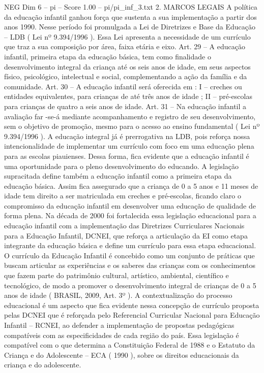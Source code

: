 \begin{textsample}{NEG Dim 6 – pi – Score 1.00 – pi/pi\_inf\_3.txt}  \label{ex:f6_neg_098}
2.
MARCOS LEGAIS A política da educação infantil ganhou força que sustenta a sua implementação a partir dos anos 1990.
Nesse período foi promulgada a Lei de Diretrizes e Base da Educação – LDB ( Lei nº 9.394/1996 ).
Essa Lei apresenta a necessidade de um currículo que traz a sua composição por área, faixa etária e eixo.
Art. 29 – A educação infantil, primeira etapa da educação básica, tem como finalidade o desenvolvimento integral da criança até os seis anos de idade, em seus aspectos físico, psicológico, intelectual e social, complementando a ação da família e da comunidade.
Art. 30 – A educação infantil será oferecida em : I – creches ou entidades equivalentes, para crianças de até três anos de idade ; II – pré-escolas para crianças de quatro a seis anos de idade.
Art. 31 – Na educação infantil a avaliação far -se-á mediante acompanhamento e registro de seu desenvolvimento, sem o objetivo de promoção, mesmo para o acesso ao ensino fundamental ( Lei nº 9.394/1996 ).
A educação integral já é prerrogativa na LDB, pois reforça nossa intencionalidade de implementar um currículo com foco em uma educação plena para as escolas piauienses.
Dessa forma, fica evidente que a educação infantil é uma oportunidade para o pleno desenvolvimento do educando.
A legislação supracitada define também a educação infantil como a primeira etapa da educação básica.
Assim fica assegurado que a criança de 0 a 5 anos e 11 meses de idade tem direito a ser matriculada em creches e pré-escolas, ficando claro o compromisso da educação infantil em desenvolver uma educação de qualidade de forma plena.
Na década de 2000 foi fortalecida essa legislação educacional para a educação infantil com a implementação das Diretrizes Curriculares Nacionais para a Educação Infantil, DCNEI, que reforça a articulação da EI como etapa integrante da educação básica e define um currículo para essa etapa educacional.
O currículo da Educação Infantil é concebido como um conjunto de práticas que buscam articular as experiências e os saberes das crianças com os conhecimentos que fazem parte do patrimônio cultural, artístico, ambiental, científico e tecnológico, de modo a promover o desenvolvimento integral de crianças de 0 a 5 anos de idade ( BRASIL, 2009, Art. 3º ).
A contextualização do processo educacional é um aspecto que fica evidente nessa concepção de currículo proposta pelas DCNEI que é reforçada pelo Referencial Curricular Nacional para Educação Infantil – RCNEI, ao defender a implementação de propostas pedagógicas compatíveis com as especificidades de cada região do país.
Essa legislação é compatível com o que determina a Constituição Federal de 1988 e o Estatuto da Criança e do Adolescente – ECA ( 1990 ), sobre os direitos educacionais da criança e do adolescente.

\end{textsample}
